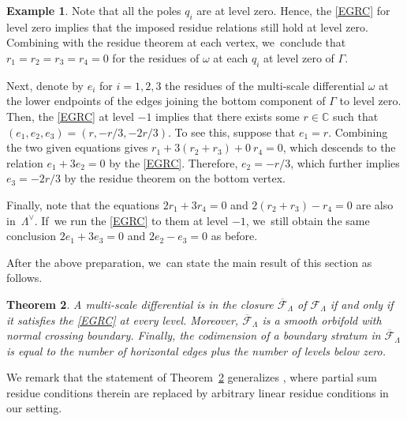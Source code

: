 \documentclass[11pt]{article}
\newcommand\CC{{\mathbb C}}
\newtheorem{thm}{Theorem}[section]
\theoremstyle{definition}
\newtheorem{ex}[thm]{Example}
\begin{document}
\begin{ex}
Note that all the poles $q_i$ are at level zero. Hence,
the \ref{EGRC} for level zero implies that the imposed residue relations still hold at level zero. Combining with the residue theorem at each vertex, we~conclude that $r_1 = r_{2}=r_{3}= r_4 = 0$ for the residues of $\omega$ at each $q_i$ at level zero of $\Gamma$.

Next, denote by $e_{i}$ for $i=1,2,3$ the residues of the multi-scale differential $\omega$ at the lower endpoints of the edges joining the bottom component of $\Gamma$ to level zero. Then, the \ref{EGRC} at level $-1$ implies
that there exists some $r\in\CC$ such that $(e_{1},e_{2},e_{3}) = (r,-r/3,-2r/3)$. To see this, suppose that $e_{1}=r$. Combining the two given equations gives $r_1 + 3(r_2 + r_3) + 0\ r_4 = 0$, which descends to the relation $e_1 + 3e_2 = 0$ by the \ref{EGRC}. Therefore, $e_2 = - r/3 $, which further implies $e_3 = -2r/3$ by the residue theorem on the bottom vertex.

Finally, note that the equations $2r_1 + 3r_4 = 0$ and
$2(r_2+r_3) - r_4 = 0$ are also in~$\Lambda^{\vee}$. If~we run the \ref{EGRC} to them at level $-1$, we~still obtain the same conclusion $2e_1 + 3e_3 = 0$ and
$2e_2 - e_3 = 0$ as before.
\end{ex}

After the above preparation, we~can state the main result of this section as follows.
\begin{thm}\label{thm:closureMSD}
A multi-scale differential is in the closure $\overline{\mathcal{F}}_{\Lambda}$
of $\mathcal{F}_{\Lambda}$ if and only if it satisfies the \ref{EGRC} at every level.
Moreover, $\overline{\mathcal{F}}_{\Lambda}$ is a smooth orbifold with normal crossing boundary. Finally, the codimension of a boundary stratum in $\overline{\mathcal{F}}_{\Lambda}$ is equal to the number of horizontal edges plus the number of levels below zero.
\end{thm}

We remark that the statement of Theorem~\ref{thm:closureMSD} generalizes \cite[Prop.\,4.2]{CMZ}, where partial sum residue conditions therein are replaced by arbitrary linear residue conditions in our setting.
\end{document}
